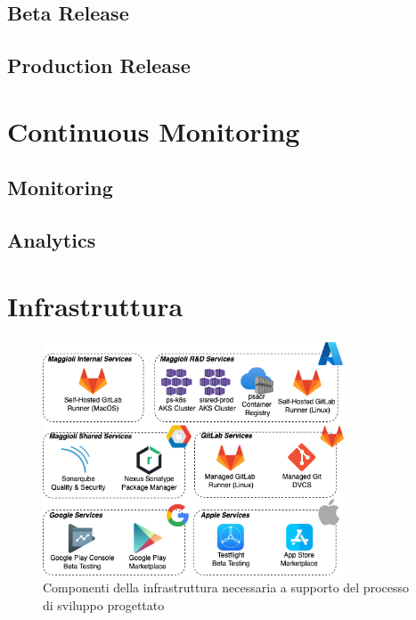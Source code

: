 \subsection{Beta Release}

\subsection{Production Release}

\section{Continuous Monitoring}
\subsection{Monitoring}
\subsection{Analytics}

\section{Infrastruttura}
\begin{figure}[H]
\centering
\includegraphics[width=0.8\textwidth]{img/tesi-3-infra.drawio.png}
\caption{Componenti della infrastruttura necessaria a supporto del processo di sviluppo progettato}
\end{figure}

